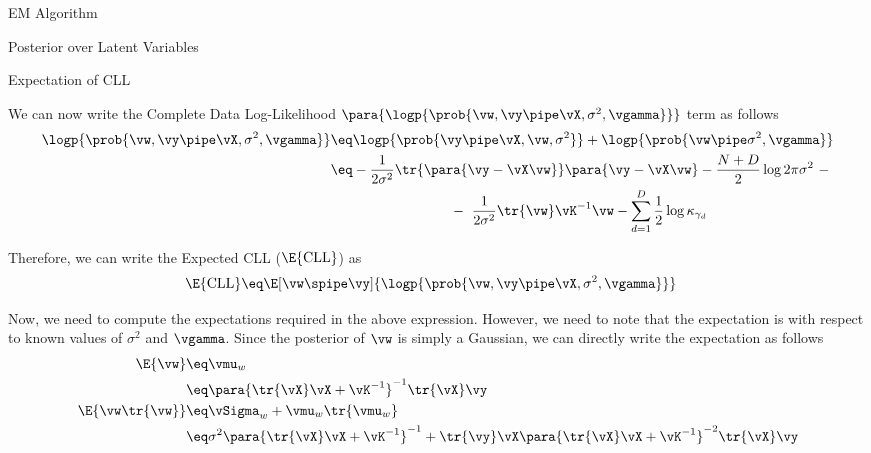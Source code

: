 \documentclass{article}
\begin{document}
\begin{question}
\begin{qsection}{EM Algorithm}
\begin{qsubsection}{Posterior over Latent Variables}
		\end{qsubsection}

		\begin{qsubsection}{Expectation of CLL}

			We can now write the Complete Data Log-Likelihood $\para{\logp{\prob{\vw, \vy \pipe \vX, \sigma^2, \vgamma}}}$ term as follows
			\begin{align*}
				\logp{\prob{\vw, \vy \pipe \vX, \sigma^2, \vgamma}}	&\eq	\logp{\prob{\vy \pipe \vX, \vw, \sigma^2}} + \logp{\prob{\vw \pipe \sigma^2, \vgamma}} \\
				&\eq	- \frac{1}{2 \sigma^2} \tr{\para{\vy - \vX \vw}} \para{\vy - \vX \vw} - \frac{N + D}{2} \log{2 \pi \sigma^2} \ - \\
				&\hspace{3cm} -\ \frac{1}{2 \sigma^2} \tr{\vw} \vK^{-1} \vw - \sum_{d = 1}^D \frac{1}{2} \log{\kappa_{\gamma_d}}
			\end{align*}

			Therefore, we can write the Expected CLL ($\E{\text{CLL}}$) as
			\begin{align*}
				\E{\text{CLL}}	&\eq	\E[\vw \spipe \vy]{\logp{\prob{\vw, \vy \pipe \vX, \sigma^2, \vgamma}}}
			\end{align*}

			Now, we need to compute the expectations required in the above expression. However, we need to note that the expectation is with respect to known values of $\sigma^2$ and $\vgamma$. Since the posterior of $\vw$ is simply a Gaussian, we can directly write the expectation as follows
			\begin{align*}
				\E{\vw}				&\eq	\vmu_w \\
				&\eq	\para{\tr{\vX} \vX + \vK^{-1}}^{-1} \tr{\vX} \vy \\
				\E{\vw \tr{\vw}}	&\eq	\vSigma_w + \vmu_w \tr{\vmu_w} \\
				&\eq	\sigma^2 \para{\tr{\vX} \vX + \vK^{-1}}^{-1} + \tr{\vy} \vX \para{\tr{\vX} \vX + \vK^{-1}}^{-2} \tr{\vX} \vy
			\end{align*}


\end{qsubsection}
\end{qsection}
\end{question}
\end{document}
